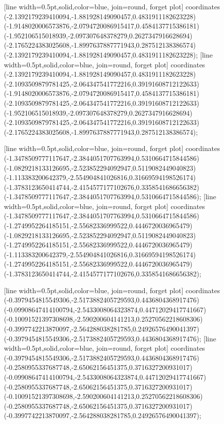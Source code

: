 [line width=0.5pt,solid,color=blue, join=round, forget plot] coordinates {(-2.1392179239410094,-1.881928149090457,0.4831911182623228) (-1.9148020006573876,-2.0794720086915417,0.4584137715386181) (-1.952106515018939,-2.097307648378279,0.2627347916628694) (-2.1765224383025608,-1.8997637887771943,0.287512138386574) (-2.1392179239410094,-1.881928149090457,0.4831911182623228)};
[line width=0.5pt,solid,color=blue, join=round, forget plot] coordinates {(-2.1392179239410094,-1.881928149090457,0.4831911182623228) (-2.1093509879781425,-2.064347541772216,0.39191608712122633) (-1.9148020006573876,-2.0794720086915417,0.4584137715386181) (-2.1093509879781425,-2.064347541772216,0.39191608712122633) (-1.952106515018939,-2.097307648378279,0.2627347916628694) (-2.1093509879781425,-2.064347541772216,0.39191608712122633) (-2.1765224383025608,-1.8997637887771943,0.287512138386574)};

[line width=0.5pt,solid,color=blue, join=round, forget plot] coordinates {(-1.3478509777117647,-2.3844051707763994,0.5310664715844586) (-1.0829218133126695,-2.523852294092947,0.5119082449040823) (-1.113383200642379,-2.554904841026816,0.31669594198526174) (-1.3783123650414744,-2.4154577177102676,0.3358541686656382) (-1.3478509777117647,-2.3844051707763994,0.5310664715844586)};
[line width=0.5pt,solid,color=blue, join=round, forget plot] coordinates {(-1.3478509777117647,-2.3844051707763994,0.5310664715844586) (-1.2749952264185151,-2.55682336999522,0.4446720036965479) (-1.0829218133126695,-2.523852294092947,0.5119082449040823) (-1.2749952264185151,-2.55682336999522,0.4446720036965479) (-1.113383200642379,-2.554904841026816,0.31669594198526174) (-1.2749952264185151,-2.55682336999522,0.4446720036965479) (-1.3783123650414744,-2.4154577177102676,0.3358541686656382)};

[line width=0.5pt,solid,color=blue, join=round, forget plot] coordinates {(-0.3979454815549306,-2.5173882405729593,0.4436804368917476) (-0.09908647414100794,-2.5433008064323874,0.44712029417741667) (-0.10091521397308698,-2.590200604141213,0.25270562218608306) (-0.3997742213870097,-2.564288038281785,0.24926576490041397) (-0.3979454815549306,-2.5173882405729593,0.4436804368917476)};
[line width=0.5pt,solid,color=blue, join=round, forget plot] coordinates {(-0.3979454815549306,-2.5173882405729593,0.4436804368917476) (-0.2580955337687748,-2.65062156451375,0.3716327200931017) (-0.09908647414100794,-2.5433008064323874,0.44712029417741667) (-0.2580955337687748,-2.65062156451375,0.3716327200931017) (-0.10091521397308698,-2.590200604141213,0.25270562218608306) (-0.2580955337687748,-2.65062156451375,0.3716327200931017) (-0.3997742213870097,-2.564288038281785,0.24926576490041397)};

